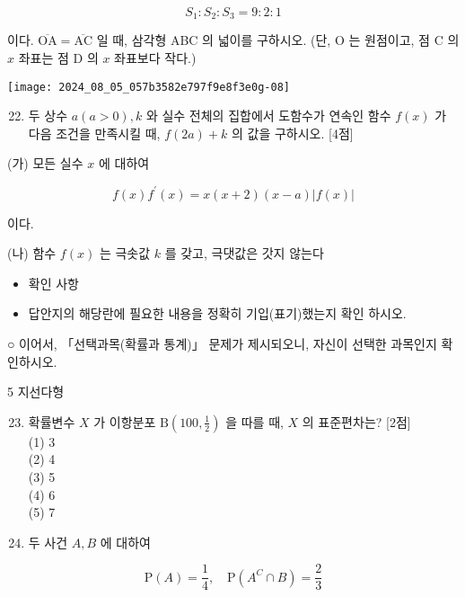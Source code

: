 \documentclass[10pt]{article}
\begin{document}
\[
S_{1}: S_{2}: S_{3}=9: 2: 1
\]

이다. \(\overline{\mathrm{OA}}=\overline{\mathrm{AC}}\) 일 때, 삼각형 ABC 의 넓이를 구하시오. (단, O 는 원점이고, 점 C 의 \(x\) 좌표는 점 D 의 \(x\) 좌표보다 작다.)

\begin{center}
\texttt{[image: 2024\_08\_05\_057b3582e797f9e8f3e0g-08]}
\end{center}

\begin{enumerate}
  \setcounter{enumi}{21}
  \item 두 상수 \(a(a>0), k\) 와 실수 전체의 집합에서 도함수가 연속인 함수 \(f(x)\) 가 다음 조건을 만족시킬 때, \(f(2 a)+k\) 의 값을 구하시오. [4점]
\end{enumerate}

(가) 모든 실수 \(x\) 에 대하여

\[
f(x) f^{\prime}(x)=x(x+2)(x-a)|f(x)|
\]

이다.

(나) 함수 \(f(x)\) 는 극솟값 \(k\) 를 갖고, 극댓값은 갓지 않는다

\begin{itemize}
  \item 확인 사항
\end{itemize}

\begin{itemize}
  \item 답안지의 해당란에 필요한 내용을 정확히 기입(표기)했는지 확인 하시오.
\end{itemize}

○ 이어서, 「선택과목(확률과 통계)」 문제가 제시되오니, 자신이 선택한 과목인지 확인하시오.

5 지선다형

\begin{enumerate}
  \setcounter{enumi}{22}
  \item 확률변수 \(X\) 가 이항분포 \(\mathrm{B}\left(100, \frac{1}{2}\right)\) 을 따를 때, \(X\) 의 표준편차는? [2점]\\
(1) 3\\
(2) 4\\
(3) 5\\
(4) 6\\
(5) 7

  \item 두 사건 \(A, B\) 에 대하여

\end{enumerate}

\[
\mathrm{P}(A)=\frac{1}{4}, \quad \mathrm{P}\left(A^{C} \cap B\right)=\frac{2}{3}
\]
\end{document}
